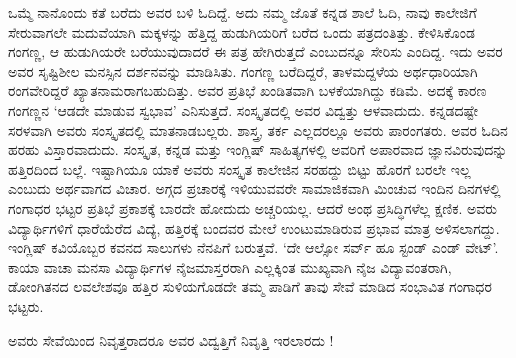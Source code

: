 {ಒಮ್ಮೆ ನಾನೊಂದು ಕತೆ ಬರೆದು ಅವರ ಬಳಿ ಓದಿದ್ದೆ. ಅದು ನಮ್ಮ ಜೊತೆ ಕನ್ನಡ ಶಾಲೆ ಓದಿ, ನಾವು ಕಾಲೇಜಿಗೆ ಸೇರುವಾಗಲೇ ಮದುವೆಯಾಗಿ ಮಕ್ಕಳನ್ನು ಹೆತ್ತಿದ್ದ ಹುಡುಗಿಯರಿಗೆ ಬರೆದ ಒಂದು ಪತ್ರದಂತಿತ್ತು. ಕೇಳಿಸಿಕೊಂಡ ಗಂಗಣ್ಣ, ಆ ಹುಡುಗಿಯರೇ  ಬರೆಯುವುದಾದರೆ ಈ ಪತ್ರ ಹೇಗಿರುತ್ತದೆ ಎಂಬುದನ್ನೂ ಸೇರಿಸು ಎಂದಿದ್ದ. ಇದು ಅವರ ಅವರ ಸೃಷ್ಟಿಶೀಲ ಮನಸ್ಸಿನ ದರ್ಶನವನ್ನು ಮಾಡಿಸಿತು. ಗಂಗಣ್ಣ ಬರೆದಿದ್ದರೆ, ತಾಳಮದ್ದಳೆಯ ಅರ್ಥಧಾರಿಯಾಗಿ ರಂಗವೇರಿದ್ದರೆ ಖ್ಯಾತನಾಮರಾಗಬಹುದಿತ್ತು. ಅವರ ಪ್ರತಿಭೆ ಖಂಡಿತವಾಗಿ  ಬಳಕೆಯಾಗಿದ್ದು ಕಡಿಮೆ. ಅದಕ್ಕೆ ಕಾರಣ ಗಂಗಣ್ಣನ ‘ಆಡದೇ ಮಾಡುವ ಸ್ವಭಾವ’ ಎನಿಸುತ್ತದೆ. ಸಂಸ್ಕೃತದಲ್ಲಿ ಅವರ ವಿದ್ವತ್ತು ಆಳವಾದುದು. ಕನ್ನಡ\-ದಷ್ಟೇ ಸರಳವಾಗಿ ಅವರು ಸಂಸ್ಕೃತದಲ್ಲಿ ಮಾತನಾಡಬಲ್ಲರು. ಶಾಸ್ತ್ರ, ತರ್ಕ ಎಲ್ಲದರಲ್ಲೂ ಅವರು ಪಾರಂಗತರು. ಅವರ ಓದಿನ ಹರಹು ವಿಸ್ತಾರವಾದುದು. ಸಂಸ್ಕೃತ,  ಕನ್ನಡ ಮತ್ತು ಇಂಗ್ಲಿಷ್ ಸಾಹಿತ್ಯಗಳಲ್ಲಿ  ಅವರಿಗೆ ಅಪಾರವಾದ ಜ್ಞಾನವಿರುವುದನ್ನು ಹತ್ತಿರದಿಂದ ಬಲ್ಲೆ. ಇಷ್ಟಾಗಿಯೂ ಯಾಕೆ ಅವರು ಸಂಸ್ಕೃತ ಕಾಲೇಜಿನ ಸರಹದ್ದು ಬಿಟ್ಟು ಹೊರಗೆ ಬರಲೇ ಇಲ್ಲ ಎಂಬುದು ಅರ್ಥವಾಗದ ವಿಚಾರ. ಅಗ್ಗದ ಪ್ರಚಾರಕ್ಕೆ ಇಳಿಯುವವರೇ ಸಾಮಾಜಿಕ\-ವಾಗಿ ಮಿಂಚುವ ಇಂದಿನ ದಿನಗಳಲ್ಲಿ ಗಂಗಾಧರ ಭಟ್ಟರ ಪ್ರತಿಭೆ ಪ್ರಕಾಶಕ್ಕೆ ಬಾರದೇ ಹೋದುದು ಅಚ್ಚರಿಯಲ್ಲ. ಆದರೆ ಅಂಥ ಪ್ರಸಿದ್ಧಿಗಳೆಲ್ಲ ಕ್ಷಣಿಕ. ಅವರು ವಿದ್ಯಾರ್ಥಿಗಳಿಗೆ ಧಾರೆಯೆರೆದ ವಿದ್ಯೆ, ಹತ್ತಿರಕ್ಕೆ ಬಂದವರ ಮೇಲೆ ಉಂಟುಮಾಡಿರುವ ಪ್ರಭಾವ ಮಾತ್ರ ಅಳಿಸಲಾಗದ್ದು. ಇಂಗ್ಲಿಷ್ ಕವಿಯೊಬ್ಬರ ಕವನದ ಸಾಲುಗಳು ನೆನಪಿಗೆ ಬರುತ್ತವೆ. ‘ದೇ ಆಲ್ಸೋ ಸರ್ವ್ ಹೂ ಸ್ಟಂಡ್ ಎಂಡ್ ವೇಟ್’. ಕಾಯಾ ವಾಚಾ ಮನಸಾ ವಿದ್ಯಾರ್ಥಿಗಳ ನೈಜಮಾಸ್ತರರಾಗಿ ಎಲ್ಲಕ್ಕಿಂತ ಮುಖ್ಯವಾಗಿ ನೈಜ ವಿದ್ಯಾವಂತರಾಗಿ, ಡೋಂಗಿತನದ ಲವಲೇಶವೂ ಹತ್ತಿರ ಸುಳಿಯಗೊಡದೇ ತಮ್ಮ ಪಾಡಿಗೆ ತಾವು ಸೇವೆ ಮಾಡಿದ ಸಂಭಾವಿತ ಗಂಗಾಧರ ಭಟ್ಟರು. 

ಅವರು ಸೇವೆಯಿಂದ ನಿವೃತ್ತರಾದರೂ ಅವರ ವಿದ್ವತ್ತಿಗೆ  ನಿವೃತ್ತಿ ಇರಲಾರದು !

\articleend
}
